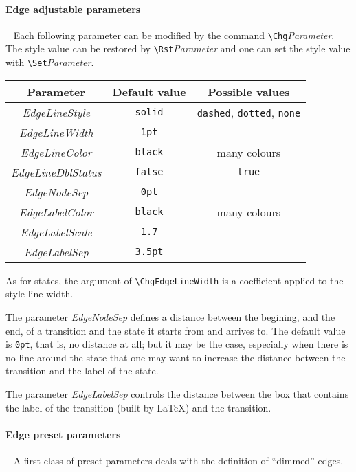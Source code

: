\documentclass[11pt,twoside]{article}
\begin{document}
\paragraph{Edge adjustable parameters}
~ Each following parameter can be modified by the command
\verb+\Chg+\textit{Parameter}. The style value can be restored by \verb+\Rst+\textit{Parameter}
and one can set the style value with \verb+\Set+\textit{Parameter}.

\begin{center}
\begin{tabular}{c|c|c|}
Parameter & Default value & Possible values\\
\hline
\textit{EdgeLineStyle} & \texttt{solid} & \texttt{dashed}, \texttt{dotted}, \texttt{none}\\
\hline
\textit{EdgeLineWidth} & \texttt{1pt} &\\
\hline
\textit{EdgeLineColor} & \texttt{black} & many colours\\
\hline
\textit{EdgeLineDblStatus} & \texttt{false} &\texttt{true}\\
\hline
\textit{EdgeNodeSep} & \texttt{0pt} & \\
\hline
\textit{EdgeLabelColor} & \texttt{black} & many colours\\
\hline
\textit{EdgeLabelScale} & \texttt{1.7} &\\
\hline
\textit{EdgeLabelSep} & \texttt{3.5pt} & \\
\hline
\end{tabular}
\end{center}

As for states, the argument of \verb+\ChgEdgeLineWidth+ is
a coefficient applied to the style line width.

The parameter \textit{EdgeNodeSep} defines a distance between the 
begining, and the end, of a transition and the state it starts from 
and arrives to. The default value is \texttt{0pt}, that is, no 
distance at all; but it may be the case, especially when there is no 
line around the state that one may want to increase the distance 
between the transition and the label of the state.

The parameter \textit{EdgeLabelSep} controls the distance between the 
box that contains the label of the transition (built by \LaTeX) and 
the transition.


\paragraph{Edge preset parameters}
~
A first class of preset parameters deals with the definition of ``dimmed'' edges.
\end{document}
